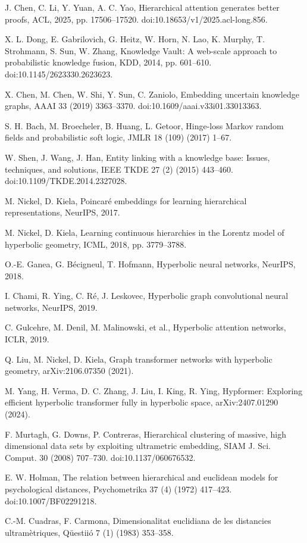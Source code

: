 \documentclass[preprint,11pt]{elsarticle}
\begin{document}
\begin{enumerate}[label={[\arabic*]},leftmargin=2.2em,itemsep=.28em,parsep=0pt]
\item J. Chen, C. Li, Y. Yuan, A. C. Yao, Hierarchical attention generates better proofs, ACL, 2025, pp. 17506--17520. doi:10.18653/v1/2025.acl-long.856.
\item X. L. Dong, E. Gabrilovich, G. Heitz, W. Horn, N. Lao, K. Murphy, T. Strohmann, S. Sun, W. Zhang, Knowledge Vault: A web-scale approach to probabilistic knowledge fusion, KDD, 2014, pp. 601--610. doi:10.1145/2623330.2623623.
\item X. Chen, M. Chen, W. Shi, Y. Sun, C. Zaniolo, Embedding uncertain knowledge graphs, AAAI 33 (2019) 3363--3370. doi:10.1609/aaai.v33i01.33013363.
\item S. H. Bach, M. Broecheler, B. Huang, L. Getoor, Hinge-loss Markov random fields and probabilistic soft logic, JMLR 18 (109) (2017) 1--67.
\item W. Shen, J. Wang, J. Han, Entity linking with a knowledge base: Issues, techniques, and solutions, IEEE TKDE 27 (2) (2015) 443--460. doi:10.1109/TKDE.2014.2327028.
\item M. Nickel, D. Kiela, Poincar\'e embeddings for learning hierarchical representations, NeurIPS, 2017.
\item M. Nickel, D. Kiela, Learning continuous hierarchies in the Lorentz model of hyperbolic geometry, ICML, 2018, pp. 3779--3788.
\item O.-E. Ganea, G. B\'ecigneul, T. Hofmann, Hyperbolic neural networks, NeurIPS, 2018.
\item I. Chami, R. Ying, C. R\'e, J. Leskovec, Hyperbolic graph convolutional neural networks, NeurIPS, 2019.
\item C. Gulcehre, M. Denil, M. Malinowski, et al., Hyperbolic attention networks, ICLR, 2019.
\item Q. Liu, M. Nickel, D. Kiela, Graph transformer networks with hyperbolic geometry, arXiv:2106.07350 (2021).
\item M. Yang, H. Verma, D. C. Zhang, J. Liu, I. King, R. Ying, Hypformer: Exploring efficient hyperbolic transformer fully in hyperbolic space, arXiv:2407.01290 (2024).
\item F. Murtagh, G. Downs, P. Contreras, Hierarchical clustering of massive, high dimensional data sets by exploiting ultrametric embedding, SIAM J. Sci. Comput. 30 (2008) 707--730. doi:10.1137/060676532.
\item E. W. Holman, The relation between hierarchical and euclidean models for psychological distances, Psychometrika 37 (4) (1972) 417--423. doi:10.1007/BF02291218.
\item C.-M. Cuadras, F. Carmona, Dimensionalitat euclidiana de les distancies ultram\`etriques, Q\"uestii\'o 7 (1) (1983) 353--358.

\end{enumerate}
\end{document}
